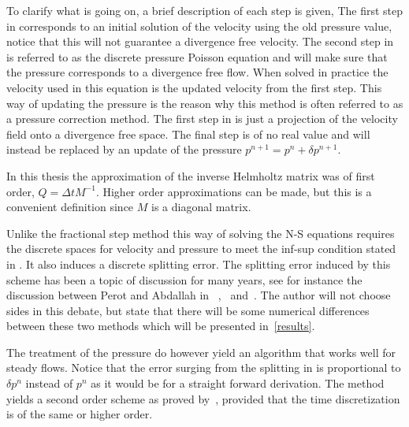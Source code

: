 To clarify what is going on, a brief description of each step is given,
The first step in  corresponds to an initial solution of the velocity using 
the old pressure value, notice that this will not guarantee a divergence free velocity.
The second step in  is referred to as the discrete pressure Poisson equation and will 
make sure that the pressure corresponds to a divergence free flow. When solved in practice 
the velocity used in this equation is the updated velocity from the first step. This way of 
updating the pressure is the reason why this method is often referred to as a pressure 
correction method.
The first step in  is just a projection of the velocity field
onto a divergence free space. The final step is of no real value and will instead be replaced 
by an update of the pressure $p^{n+1} = p^{n}+\delta p^{n+1}$.

In this thesis the approximation of the inverse Helmholtz matrix was of first order, 
$Q = \Delta t M^{-1}$. Higher order approximations can be made, but this is 
a convenient definition since $M$ is a diagonal matrix.

Unlike the fractional step method this way of solving the N-S equations  
requires the discrete spaces for velocity and pressure
to meet the inf-sup condition stated in . 
It also induces a discrete splitting error. The splitting error induced by this scheme 
has been a topic of discussion for many years, see for instance the discussion between Perot and Abdallah in
~\cite{Perot},~\cite{Abdallah} and~\cite{Perotcomments}. The author will not choose sides in this debate, 
but state that there will be some numerical differences between these two methods which will be presented 
in~\cref{results}.

The treatment of the pressure do however yield an algorithm that works well for steady flows.
Notice that the error surging from the splitting in 
is proportional to $\delta p^n$ instead of $p^n$ as it would be for a straight forward derivation. 
The method yields a second order scheme as proved by~\cite{vanKan},
provided that the time discretization is of the same or higher order.
